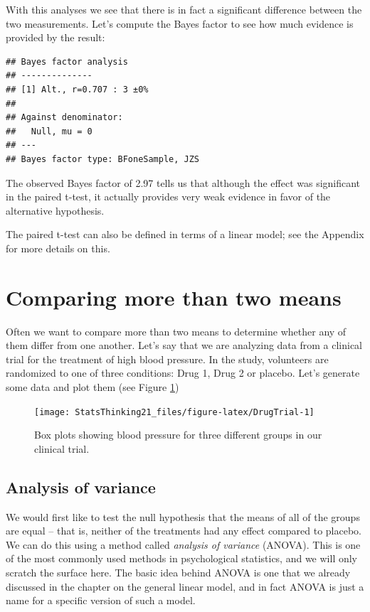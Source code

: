 \documentclass[12pt,]{book}
\theoremstyle{definition}
\theoremstyle{definition}
\theoremstyle{definition}
\theoremstyle{remark}
\begin{document}
With this analyses we see that there is in fact a significant difference between the two measurements. Let's compute the Bayes factor to see how much evidence is provided by the result:

\begin{verbatim}
## Bayes factor analysis
## --------------
## [1] Alt., r=0.707 : 3 ±0%
## 
## Against denominator:
##   Null, mu = 0 
## ---
## Bayes factor type: BFoneSample, JZS
\end{verbatim}

The observed Bayes factor of 2.97 tells us that although the effect was significant in the paired t-test, it actually provides very weak evidence in favor of the alternative hypothesis.

The paired t-test can also be defined in terms of a linear model; see the Appendix for more details on this.

\hypertarget{comparing-more-than-two-means}{%
\section{Comparing more than two means}\label{comparing-more-than-two-means}}

Often we want to compare more than two means to determine whether any of them differ from one another. Let's say that we are analyzing data from a clinical trial for the treatment of high blood pressure. In the study, volunteers are randomized to one of three conditions: Drug 1, Drug 2 or placebo. Let's generate some data and plot them (see Figure \ref{fig:DrugTrial})

\begin{figure}
\texttt{[image: StatsThinking21\_files/figure-latex/DrugTrial-1]} \caption{Box plots showing blood pressure for three different groups in our clinical trial.}\label{fig:DrugTrial}
\end{figure}

\hypertarget{ANOVA}{%
\subsection{Analysis of variance}\label{ANOVA}}

We would first like to test the null hypothesis that the means of all of the groups are equal -- that is, neither of the treatments had any effect compared to placebo. We can do this using a method called \emph{analysis of variance} (ANOVA). This is one of the most commonly used methods in psychological statistics, and we will only scratch the surface here. The basic idea behind ANOVA is one that we already discussed in the chapter on the general linear model, and in fact ANOVA is just a name for a specific version of such a model.
\end{document}
